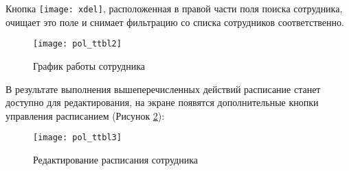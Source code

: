  \begin{prim}
 Кнопка \texttt{[image: xdel]}, расположенная в правой части поля поиска сотрудника, очищает это поле и снимает фильтрацию со списка сотрудников соответственно.
 \end{prim}

\begin{figure}[ht]\centering
 \texttt{[image: pol\_ttbl2]}
 \caption{График работы сотрудника}
 \label{img_pol_ttbl2}
\end{figure}

В результате выполнения вышеперечисленных действий расписание станет доступно для редактирования, на экране появятся дополнительные кнопки управления расписанием (Рисунок \ref{img_pol_ttbl3}):

\begin{figure}[ht]\centering
 \texttt{[image: pol\_ttbl3]}
 \caption{Редактирование расписания сотрудника}
 \label{img_pol_ttbl3}
\end{figure}

